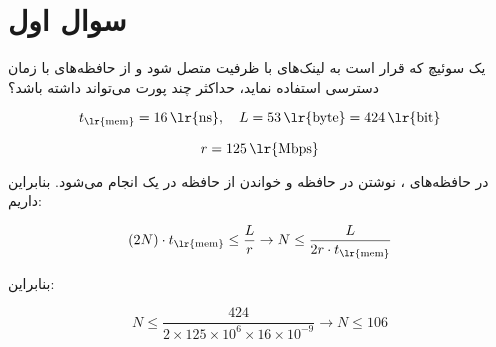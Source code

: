 \section{سوال اول}

یک سوئیچ  که قرار است به لینک‌های  با ظرفیت  متصل شود و از حافظه‌های با زمان دسترسی  استفاده نماید، حداکثر چند پورت می‌تواند داشته باشد؟


\begin{qsolve}
	
	$$
	t_{\text{\lr{mem}}} = 16 \, \text{\lr{ns}}, \quad L = 53 \, \text{\lr{byte}} = 424 \, \text{\lr{bit}}
	$$
	
	$$
	r = 125 \, \text{\lr{Mbps}}
	$$
	
	در حافظه‌های ،
	 نوشتن در حافظه و  خواندن از حافظه در یک  انجام می‌شود. بنابراین داریم:
	
	
	$$
	(2N) \cdot t_{\text{\lr{mem}}} \leq \frac{L}{r} \rightarrow N \leq \frac{L}{2r \cdot t_{\text{\lr{mem}}}}
	$$
	
	بنابراین:
	
	$$
		N \leq \frac{424}{2 \times 125 \times 10^6 \times 16 \times 10^{-9}} \rightarrow N \leq 106
	$$
	
\end{qsolve}
